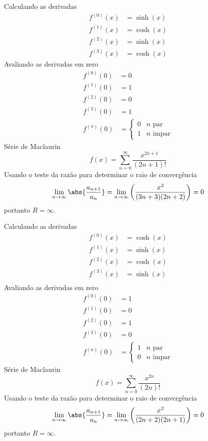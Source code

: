 \begin{exercises}
\begin{exercise}
\begin{answer}
\begin{alphalist}
  \item Calculando as derivadas
  \begin{align*}
    f^{(0)}(x) & = \sinh(x) \\
    f^{(1)}(x) & = \cosh(x) \\
    f^{(2)}(x) & = \sinh(x) \\
    f^{(3)}(x) & = \cosh(x)
  \end{align*}
  Avaliando as derivadas em zero
  \begin{align*}
    f^{(0)}(0) & = 0 \\
    f^{(1)}(0) & = 1 \\
    f^{(2)}(0) & = 0 \\
    f^{(3)}(0) & = 1 \\
    f^{(n)}(0) & =
    \begin{cases}
      0 & n \text{ par} \\
      1 & n \text{ impar}
    \end{cases}
  \end{align*}
  Série de Maclaurin
  \[
    f(x)= \sum_{n=0}^\infty \frac{x^{2n+1}}{(2n+1)!}
  \]
  Usando o teste da razão para determinar o raio de convergência
  \[
    \lim_{n\to\infty}\abs{\frac{a_{n+1}}{a_n}} =
    \lim_{n\to\infty}\left(\frac{x^2}{(3n+3)(2n+2)}\right) = 0
  \]
  portanto $R=\infty$.

  \item Calculando as derivadas
  \begin{align*}
    f^{(0)}(x) & = \cosh(x) \\
    f^{(1)}(x) & = \sinh(x) \\
    f^{(2)}(x) & = \cosh(x) \\
    f^{(3)}(x) & = \sinh(x) \\
  \end{align*}
  Avaliando as derivadas em zero
  \begin{align*}
    f^{(0)}(0) & = 1 \\
    f^{(1)}(0) & = 0 \\
    f^{(2)}(0) & = 1 \\
    f^{(3)}(0) & = 0 \\
    f^{(n)}(0) & = \begin{cases}
                     1 & n \text{ par} \\
                     0 & n \text{ impar}
                   \end{cases}
  \end{align*}
  Série de Maclaurin
  \[
    f(x) = \sum_{n=0}^\infty  \frac{x^{2n}}{(2n)!}
  \]
  Usando o teste da razão para determinar o raio de convergência
  \[
    \lim_{n\to\infty}\abs{\frac{a_{n+1}}{a_n}} =
    \lim_{n\to\infty}\left(\frac{x^2}{(2n+2)(2n+1)}\right) = 0
  \]
  portanto $R=\infty$.
  \end{alphalist}
\end{answer}
\end{exercise}


\end{exercises}
